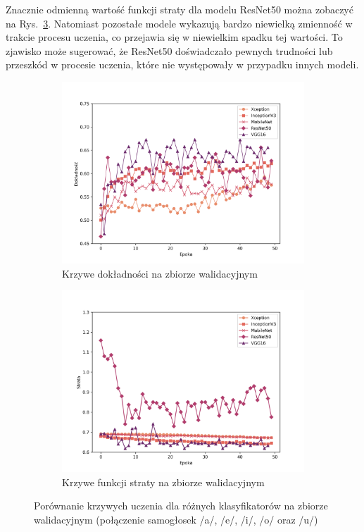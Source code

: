 Znacznie odmienną wartość funkcji straty dla modelu ResNet50 można zobaczyć na Rys.~\ref{fig:vowels_results}.
Natomiast pozostałe modele wykazują bardzo niewielką zmienność w trakcie procesu uczenia, co przejawia się w niewielkim spadku tej wartości.
To zjawisko może sugerować, że ResNet50 doświadczało pewnych trudności lub przeszkód w procesie uczenia, które nie występowały w przypadku innych modeli.


\begin{figure}[ht]
    \centering
    \begin{subfigure}{0.49\textwidth}
        \centering
        \includegraphics[width=\textwidth]{./img/results/all_acc}
        \caption{Krzywe dokładności na zbiorze walidacyjnym\@}
        \label{fig:vowels_acc}
    \end{subfigure}
    \begin{subfigure}{0.49\textwidth}
        \centering
        \includegraphics[width=\textwidth]{./img/results/all_loss}
        \caption{Krzywe funkcji straty na zbiorze walidacyjnym\@}
        \label{fig:vowels_loss}
    \end{subfigure}

    \caption{Porównanie krzywych uczenia dla różnych klasyfikatorów na zbiorze walidacyjnym (połączenie samogłosek /a/, /e/, /i/, /o/ oraz /u/)}
    \label{fig:vowels_results}
\end{figure}

